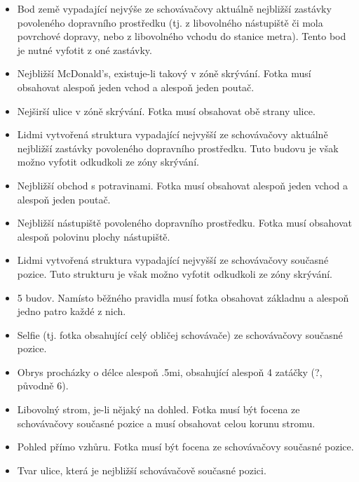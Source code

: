 \begin{itemize}
	\item Bod země vypadající nejvýše ze schovávačovy aktuálně nejbližší zastávky povoleného dopravního prostředku (tj. z libovolného nástupiště či mola povrchové dopravy, nebo z libovolného vchodu do stanice metra). Tento bod je nutné vyfotit z oné zastávky.
	\item Nejbližší McDonald's, existuje-li takový v zóně skrývání. Fotka musí obsahovat alespoň jeden vchod a alespoň jeden poutač.
	\item Nejširší ulice v zóně skrývání. Fotka musí obsahovat obě strany ulice.
	\item Lidmi vytvořená struktura vypadající nejvyšší ze schovávačovy aktuálně nejbližší zastávky povoleného dopravního prostředku. Tuto budovu je však možno vyfotit odkudkoli ze zóny skrývání.
	\item Nejbližší obchod s potravinami. Fotka musí obsahovat alespoň jeden vchod a alespoň jeden poutač.
	\item Nejbližší nástupiště povoleného dopravního prostředku. Fotka musí obsahovat alespoň polovinu plochy nástupiště.
	\item Lidmi vytvořená struktura vypadající nejvyšší ze schovávačovy současné pozice. Tuto strukturu je však možno vyfotit odkudkoli ze zóny skrývání.
	\item 5 budov. Namísto běžného pravidla musí fotka obsahovat základnu a alespoň jedno patro každé z nich.
	\item Selfie (tj. fotka obsahující celý obličej schovávače) ze schovávačovy současné pozice.
	\item Obrys procházky o délce alespoň \dist.5mi, obsahující alespoň 4 zatáčky (?, původně 6).
	\item Libovolný strom, je-li nějaký na dohled. Fotka musí být focena ze schovávačovy současné pozice a musí obsahovat celou korunu stromu.
	\item Pohled přímo vzhůru. Fotka musí být focena ze schovávačovy současné pozice.
	\item Tvar ulice, která je nejbližší schovávačově současné pozici.
\end{itemize}

